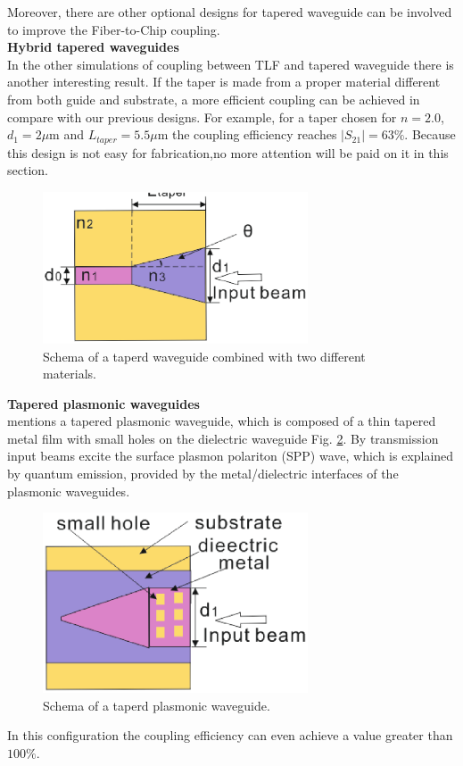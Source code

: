 Moreover, there are other optional designs for tapered waveguide can be involved to improve the Fiber-to-Chip coupling.\\
\textbf{Hybrid tapered waveguides}\\  
In the other simulations of coupling between TLF and tapered waveguide there is another interesting result. If the taper is made from a proper material different from both guide and substrate, a more efficient coupling can be achieved in compare with our previous designs. For example, for a taper chosen for $n=2.0$, $d_{1}=2\mu$m and $L_{taper}=5.5\mu$m the coupling efficiency reaches $|S_{21}|=63\%$.  Because this design is not easy for fabrication,no more attention will be paid on it in this section.   
\begin{figure}[!ht]
\centering
\includegraphics[width=0.7\textwidth]{bilder/tapered_waveguide_others}
\caption{Schema of a taperd waveguide combined with two different materials.}
\label{fig:tapered_waveguide_others}
\end{figure}

\textbf{Tapered plasmonic waveguides}\\
\cite{tapered_plasmonic_waveguides} mentions a tapered plasmonic waveguide, which is composed of a thin tapered metal film with small holes on the dielectric waveguide Fig. \ref{fig:tapered_waveguide_plasmonic}. By transmission input beams excite the surface plasmon polariton (SPP) wave, which is explained by quantum emission, provided by the metal/dielectric interfaces of the plasmonic waveguides.
\begin{figure}[!ht]
\centering
\includegraphics[width=0.7\textwidth]{bilder/tapered_waveguide_plasmonic}
\caption{Schema of a taperd plasmonic waveguide.}
\label{fig:tapered_waveguide_plasmonic}
\end{figure}
In this configuration the coupling efficiency can even achieve a value greater than $100\%$. 

